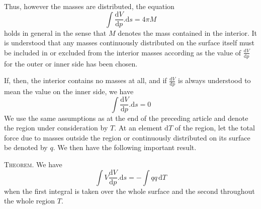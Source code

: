 Thus, however the masses are distributed, the equation
\[
\int\frac{\mathrm dV}{\mathrm dp}.\mathrm ds=4\pi M
\]
holds in general in the sense that $M$ denotes the mass contained in the interior. It is understood that any masses continuously distributed on the surface itself must be included in or excluded from the interior masses according as the value of $\frac{\mathrm dV}{\mathrm dp}$ for the outer or inner side has been chosen.

If, then, the interior contains no masses at all, and if $\frac{\mathrm dV}{\mathrm dp}$ is always understood to mean the value on the inner side, we have
\[
\int\frac{\mathrm dV}{\mathrm dp}.\mathrm ds=0
\]
We use the same assumptions as at the end of the preceding article and denote the region under consideration by $T$. At an element $\mathrm dT$ of the region, let the total force due to masses outside the region or continuously distributed on its surface be denoted by $q$. We then have the following important result.

\textsc{Theorem.} We have
\[
\int V\frac{\mathrm dV}{\mathrm dp}.\mathrm ds=-\int qq\,\mathrm dT
\]
when the first integral is taken over the whole surface and the second throughout the whole region $T$.

